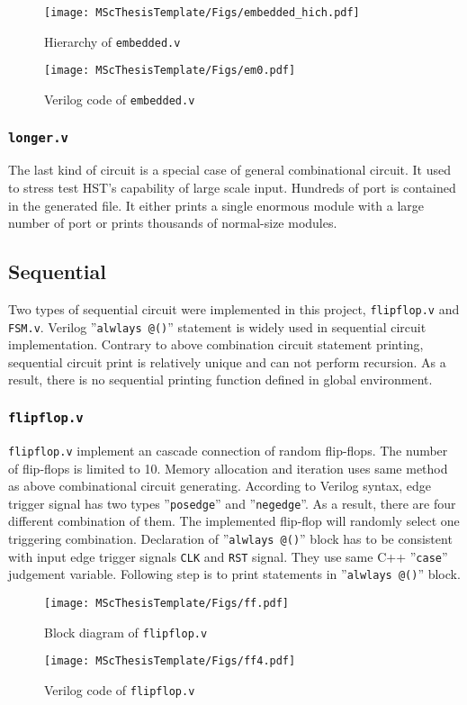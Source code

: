 \begin{figure}[htbp]
    \centering
    \texttt{[image: MScThesisTemplate/Figs/embedded\_hich.pdf]}
    \caption{\footnotesize Hierarchy of \texttt{embedded.v}}
    \label{fig:hierarchy}
\end{figure}
\begin{figure}[htbp]
    \centering
    \texttt{[image: MScThesisTemplate/Figs/em0.pdf]}
    \caption{\footnotesize Verilog code of \texttt{embedded.v}}
\end{figure}
\subsubsection{\texttt{longer.v}}
The last kind of circuit is a special case of general combinational circuit. It used to stress test HST's capability of large scale input. Hundreds of port is contained in the generated file. It either prints a single enormous module with a large number of port or prints thousands of normal-size modules.

\subsection{Sequential}
Two types of sequential circuit were implemented in this project, \texttt{flipflop.v} and \texttt{FSM.v}. Verilog ''\texttt{alwlays @()}'' statement is widely used in sequential circuit implementation. Contrary to above combination circuit statement printing, sequential circuit print is relatively unique and can not perform recursion. As a result, there is no sequential printing function defined in global environment.

\subsubsection{\texttt{flipflop.v}}
\texttt{flipflop.v} implement an cascade connection of random flip-flops. The number of flip-flops is limited to 10. Memory allocation and iteration uses same method as above combinational circuit generating. According to Verilog syntax, edge trigger signal has two types ''\texttt{posedge}'' and ''\texttt{negedge}''. As a result, there are four different combination of them. The implemented flip-flop will randomly select one triggering combination. Declaration of ''\texttt{alwlays @()}'' block has to be consistent with input edge trigger signals \texttt{CLK} and \texttt{RST} signal. They use same C++ ''\texttt{case}'' judgement variable.  Following step is to print statements in ''\texttt{alwlays @()}'' block. 
\begin{figure}[htb]
    \centering
    \texttt{[image: MScThesisTemplate/Figs/ff.pdf]}
    \caption{\footnotesize Block diagram of \texttt{flipflop.v}}
    \label{fig:ff}
\end{figure}
\begin{figure}[htb]
    \centering
    \texttt{[image: MScThesisTemplate/Figs/ff4.pdf]}
    \caption{\footnotesize Verilog code of \texttt{flipflop.v}}
\end{figure}

